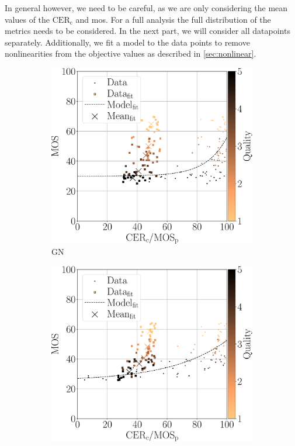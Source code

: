 In general however, we need to be careful, as we are only considering the mean values of the $\text{CER}_{\text{c}}$ and \gls{mos}.
For a full analysis the full distribution of the metrics needs to be considered.
In the next part, we will consider all datapoints separately.
Additionally, we fit a model to the data points to remove nonlinearities from the objective values as described in \autoref{sec:nonlinear}.




\begin{figure}[h!]
\centering
    \begin{subfigure}[b]{0.32\textwidth}
        \includegraphics[width=\textwidth]{../../images/analyze/mos_cer_ref_fitted_mean_ezocr_GN.pdf}
        \caption{GN}
        \label{fig:mos_cer_ref_fitted_mean_ezocr_GN}
    \end{subfigure}%
    \hfill
    \begin{subfigure}[b]{0.32\textwidth}
        \includegraphics[width=\textwidth]{../../images/analyze/mos_cer_ref_fitted_mean_ezocr_GB.pdf}

\end{subfigure}
\end{figure}
